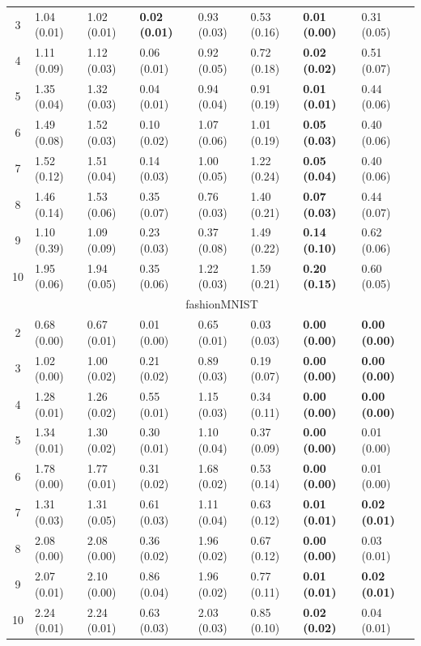 \begin{fullwidth}
\begin{table}[!ht]
\begin{adjustbox}{max width=1.\textwidth}{}
\begin{tabular}{@{}c|lllllll@{}}
3    & 1.04 (0.01) & 1.02 (0.01) & \textbf{0.02 (0.01)} & 0.93 (0.03) & 0.53 (0.16) & \textbf{0.01 (0.00)} & 0.31 (0.05) \\
4    & 1.11 (0.09) & 1.12 (0.03) & 0.06 (0.01)          & 0.92 (0.05) & 0.72 (0.18) & \textbf{0.02 (0.02)} & 0.51 (0.07) \\
5    & 1.35 (0.04) & 1.32 (0.03) & 0.04 (0.01)          & 0.94 (0.04) & 0.91 (0.19) & \textbf{0.01 (0.01)} & 0.44 (0.06) \\
6    & 1.49 (0.08) & 1.52 (0.03) & 0.10 (0.02)          & 1.07 (0.06) & 1.01 (0.19) & \textbf{0.05 (0.03)} & 0.40 (0.06) \\
7    & 1.52 (0.12) & 1.51 (0.04) & 0.14 (0.03)          & 1.00 (0.05) & 1.22 (0.24) & \textbf{0.05 (0.04)} & 0.40 (0.06) \\
8    & 1.46 (0.14) & 1.53 (0.06) & 0.35 (0.07)          & 0.76 (0.03) & 1.40 (0.21) & \textbf{0.07 (0.03)} & 0.44 (0.07) \\
9    & 1.10 (0.39) & 1.09 (0.09) & 0.23 (0.03)          & 0.37 (0.08) & 1.49 (0.22) & \textbf{0.14 (0.10)} & 0.62 (0.06) \\
10   & 1.95 (0.06) & 1.94 (0.05) & 0.35 (0.06)          & 1.22 (0.03) & 1.59 (0.21) & \textbf{0.20 (0.15)} & 0.60 (0.05)
\\ \midrule
& \multicolumn{7}{c}{\multirow{2}{*}{fashionMNIST}}  \\
& \multicolumn{7}{c}{} \\\midrule
2 & 0.68 (0.00) & 0.67 (0.01) & 0.01 (0.00) & 0.65 (0.01) & 0.03 (0.03) & \textbf{0.00 (0.00)} & \textbf{0.00 (0.00)} \\
3 & 1.02 (0.00) & 1.00 (0.02) & 0.21 (0.02) & 0.89 (0.03) & 0.19 (0.07) & \textbf{0.00 (0.00)} & \textbf{0.00 (0.00)} \\
4 & 1.28 (0.01) & 1.26 (0.02) & 0.55 (0.01) & 1.15 (0.03) & 0.34 (0.11) & \textbf{0.00 (0.00)} & \textbf{0.00 (0.00)} \\
5 & 1.34 (0.01) & 1.30 (0.02) & 0.30 (0.01) & 1.10 (0.04) & 0.37 (0.09) & \textbf{0.00 (0.00)} & 0.01 (0.00) \\
6 & 1.78 (0.00) & 1.77 (0.01) & 0.31 (0.02) & 1.68 (0.02) & 0.53 (0.14) & \textbf{0.00 (0.00)} & 0.01 (0.00) \\
7 & 1.31 (0.03) & 1.31 (0.05) & 0.61 (0.03) & 1.11 (0.04) & 0.63 (0.12) & \textbf{0.01 (0.01)} & \textbf{0.02 (0.01)} \\
8 & 2.08 (0.00) & 2.08 (0.00) & 0.36 (0.02) & 1.96 (0.02) & 0.67 (0.12) & \textbf{0.00 (0.00)} & 0.03 (0.01) \\
9 & 2.07 (0.01) & 2.10 (0.00) & 0.86 (0.04) & 1.96 (0.02) & 0.77 (0.11) & \textbf{0.01 (0.01)} & \textbf{0.02 (0.01)} \\
10& 2.24 (0.01) & 2.24 (0.01) & 0.63 (0.03) & 2.03 (0.03) & 0.85 (0.10) & \textbf{0.02 (0.02)} & 0.04 (0.01)
 \\
\bottomrule
\end{tabular}
\end{adjustbox}
\vspace*{\baselineskip}
\end{table}
\end{fullwidth}

